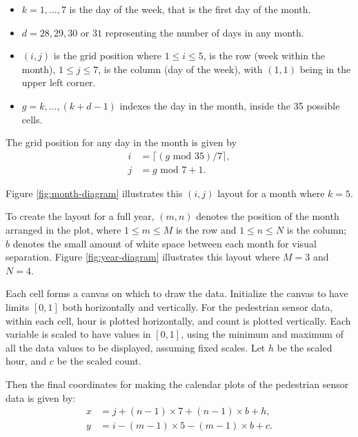\documentclass[12pt]{article}
\providecommand{\tightlist}{%
  \setlength{\itemsep}{0pt}\setlength{\parskip}{0pt}}
\begin{document}
\begin{itemize}
\tightlist
\item
  \(k = 1, \dots , 7\) is the day of the week, that is the first day of the month.
\item
  \(d = 28, 29, 30\) or \(31\) representing the number of days in any month.
\item
  \((i, j)\) is the grid position where \(1 \le i \le 5\), is the row (week within the month), \(1 \le j \le 7\), is the column (day of the week), with \((1, 1)\) being in the upper left corner.
\item
  \(g = k, \dots,(k + d - 1)\) indexes the day in the month, inside the 35 possible cells.
\end{itemize}

The grid position for any day in the month is given by
\begin{equation}
  \begin{aligned}
  i &= \lceil (g \text{ mod } 35) / 7\rceil, \\
  j &= g \text{ mod } 7 + 1.
  \end{aligned}
  \label{eq:grid}
\end{equation}

\noindent Figure \ref{fig:month-diagram} illustrates this \((i, j)\) layout for a month where \(k = 5\).

To create the layout for a full year, \((m, n)\) denotes the position of the month arranged in the plot, where \(1 \le m \le M\) is the row and \(1 \le n \le N\) is the column; \(b\) denotes the small amount of white space between each month for visual separation. Figure \ref{fig:year-diagram} illustrates this layout where \(M = 3\) and \(N = 4\).

Each cell forms a canvas on which to draw the data. Initialize the canvas to have limits \([0, 1]\) both horizontally and vertically. For the pedestrian sensor data, within each cell, hour is plotted horizontally, and count is plotted vertically. Each variable is scaled to have values in \([0, 1]\), using the minimum and maximum of all the data values to be displayed, assuming fixed scales. Let \(h\) be the scaled hour, and \(c\) be the scaled count.

Then the final coordinates for making the calendar plots of the pedestrian sensor data is given by:
\begin{equation}
  \begin{aligned}
  x &= j + (n - 1) \times 7 + (n - 1) \times b + h, \\
  y &= i - (m - 1) \times 5 - (m - 1) \times b + c.
  \end{aligned}
  \label{eq:final}
\end{equation}
\end{document}
